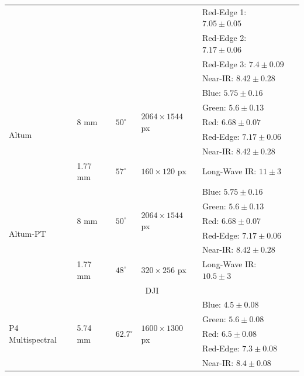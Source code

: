 \begin{table}[h!]
\begin{tabular}{llllll}
        & & & & Red-Edge 1: $7.05 \pm 0.05$ &\\
        & & & & Red-Edge 2: $7.17 \pm 0.06$ &\\
        & & & & Red-Edge 3: $7.4 \pm 0.09$ &\\
        & & & & Near-IR: $8.42 \pm 0.28$ &\\
        \cmidrule{1-6}
        \multirow{6}{*}{Altum}     & \multirow{5}{*}{8 \si{\milli\meter}}   & \multirow{5}{*}{$50^{\circ}$}  & \multirow{5}{*}{$2064 \times 1544$ px} & Blue: $5.75 \pm 0.16$    & \multirow{6}{*}{\cite{hutton_high_2020}}\\
        & & & & Green: $5.6 \pm 0.13$ &\\
        & & & & Red: $6.68 \pm 0.07$ &\\
        & & & & Red-Edge: $7.17 \pm 0.06$ &\\
        & & & & Near-IR: $8.42 \pm 0.28$ &\\
        \cmidrule{2-6}
        & \multirow{1}{*}{1.77 \si{\milli\meter}} & \multirow{1}{*}{$57^{\circ}$} & \multirow{1}{*}{$160 \times 120$ px} & Long-Wave IR: $11 \pm 3$ &\\
        \cmidrule{1-6}
        \multirow{6}{*}{Altum-PT}     & \multirow{5}{*}{8 \si{\milli\meter}}   & \multirow{5}{*}{$50^{\circ}$}  & \multirow{5}{*}{$2064 \times 1544$ px} & Blue: $5.75 \pm 0.16$    & \multirow{6}{*}{\cite{hutton_high_2020}}\\
        & & & & Green: $5.6 \pm 0.13$ &\\
        & & & & Red: $6.68 \pm 0.07$ &\\
        & & & & Red-Edge: $7.17 \pm 0.06$ &\\
        & & & & Near-IR: $8.42 \pm 0.28$ &\\
        \cmidrule{2-6}
        & \multirow{1}{*}{1.77 \si{\milli\meter}} & \multirow{1}{*}{$48^{\circ}$} & \multirow{1}{*}{$320 \times 256$ px} & Long-Wave IR: $10.5 \pm 3$ &\\
        \cmidrule{1-6}
        \multicolumn{6}{c}{DJI}\\
        \cmidrule{1-6}
        \multirow{5}{*}{P4 Multispectral}     & \multirow{5}{*}{5.74 \si{\milli\meter}}   & \multirow{5}{*}{$62.7^{\circ}$}  & \multirow{5}{*}{$1600 \times 1300$ px} & Blue: $4.5 \pm 0.08$    & \multirow{5}{*}{\cite{lu_experimental_2020}}\\
        & & & & Green: $5.6 \pm 0.08$ &\\
        & & & & Red: $6.5 \pm 0.08$ &\\
        & & & & Red-Edge: $7.3 \pm 0.08$ &\\
        & & & & Near-IR: $8.4 \pm 0.08$ &\\
        \bottomrule
    \end{tabular}
\end{table}
\renewcommand{\arraystretch}{1}

